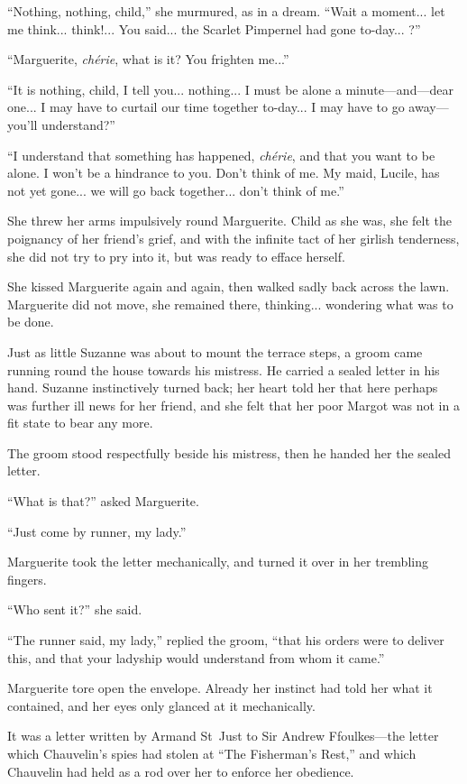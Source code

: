 \enquote{Nothing, nothing, child,} she murmured, as in a dream. \enquote{Wait a moment... let me think... think!... You said... the Scarlet Pimpernel had gone to-day... ?}

\enquote{Marguerite, \textit{chérie}, what is it? You frighten me...}

\enquote{It is nothing, child, I tell you... nothing... I must be alone a minute---and---dear one... I may have to curtail our time together to-day... I may have to go away---you'll understand?}

\enquote{I understand that something has happened, \textit{chérie}, and that you want to be alone. I won't be a hindrance to you. Don't think of me. My maid, Lucile, has not yet gone... we will go back together... don't think of me.}

She threw her arms impulsively round Marguerite. Child as she was, she felt the poignancy of her friend's grief, and with the infinite tact of her girlish tenderness, she did not try to pry into it, but was ready to efface herself.

She kissed Marguerite again and again, then walked sadly back across the lawn. Marguerite did not move, she remained there, thinking... wondering what was to be done.

Just as little Suzanne was about to mount the terrace steps, a groom came running round the house towards his mistress. He carried a sealed letter in his hand. Suzanne instinctively turned back; her heart told her that here perhaps was further ill news for her friend, and she felt that her poor Margot was not in a fit state to bear any more.

The groom stood respectfully beside his mistress, then he handed her the sealed letter.

\enquote{What is that?} asked Marguerite.

\enquote{Just come by runner, my lady.}

Marguerite took the letter mechanically, and turned it over in her trembling fingers.

\enquote{Who sent it?} she said.

\enquote{The runner said, my lady,} replied the groom, \enquote{that his orders were to deliver this, and that your ladyship would understand from whom it came.}

Marguerite tore open the envelope. Already her instinct had told her what it contained, and her eyes only glanced at it mechanically.

It was a letter written by Armand St~Just to Sir Andrew Ffoulkes---the letter which Chauvelin's spies had stolen at \enquote{The Fisherman's Rest,} and which Chauvelin had held as a rod over her to enforce her obedience.

